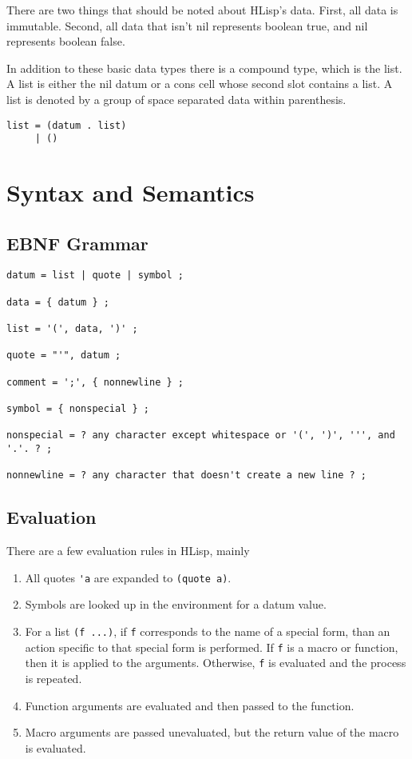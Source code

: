 \documentclass[12pt]{article}
\begin{document}
There are two things that should be noted about HLisp's data. First, all data is
immutable. Second, all data that isn't nil represents boolean true, and nil
represents boolean false.

In addition to these basic data types there is a compound type, which is the
list. A list is either the nil datum or a cons cell whose second slot contains a
list. A list is denoted by a group of space separated data within parenthesis.

\begin{verbatim}
list = (datum . list)
     | ()
\end{verbatim}

\section{Syntax and Semantics}

\subsection{EBNF Grammar}

\begin{verbatim}
datum = list | quote | symbol ;

data = { datum } ;

list = '(', data, ')' ;

quote = "'", datum ;

comment = ';', { nonnewline } ;

symbol = { nonspecial } ;

nonspecial = ? any character except whitespace or '(', ')', ''', and '.'. ? ;

nonnewline = ? any character that doesn't create a new line ? ;
\end{verbatim}

\subsection{Evaluation}

There are a few evaluation rules in HLisp, mainly

\begin{enumerate}
\item All quotes \verb!'a! are expanded to \verb!(quote a)!.

\item Symbols are looked up in the environment for a datum value.

\item For a list \verb!(f ...)!, if \verb!f! corresponds to the name of a
  special form, than an action specific to that special form is performed. If
  \verb!f! is a macro or function, then it is applied to the
  arguments. Otherwise, \verb!f! is evaluated and the process is repeated.

\item Function arguments are evaluated and then passed to the function.

\item Macro arguments are passed unevaluated, but the return value of the macro
  is evaluated.
\end{enumerate}
\end{document}
